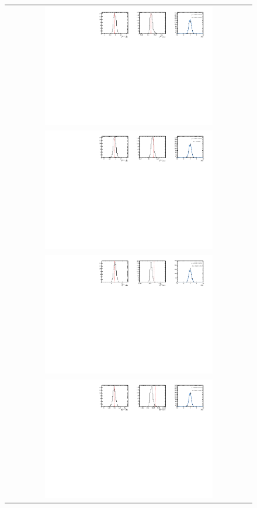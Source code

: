 \begin{figure}
  \centering
  \begin{tabular}{c}
\includegraphics[width=0.7\textwidth]{ANA_resources/Plots/Data_fit/FitterBias//A_signal_KK_run2.pdf} \\
\includegraphics[width=0.7\textwidth]{ANA_resources/Plots/Data_fit/FitterBias//R_signal_KK_run2.pdf} \\
\includegraphics[width=0.7\textwidth]{ANA_resources/Plots/Data_fit/FitterBias//A_Bs_KK_run2.pdf} \\
\includegraphics[width=0.7\textwidth]{ANA_resources/Plots/Data_fit/FitterBias//R_ds_KK_run2.pdf} \\

\end{tabular}
\end{figure}

